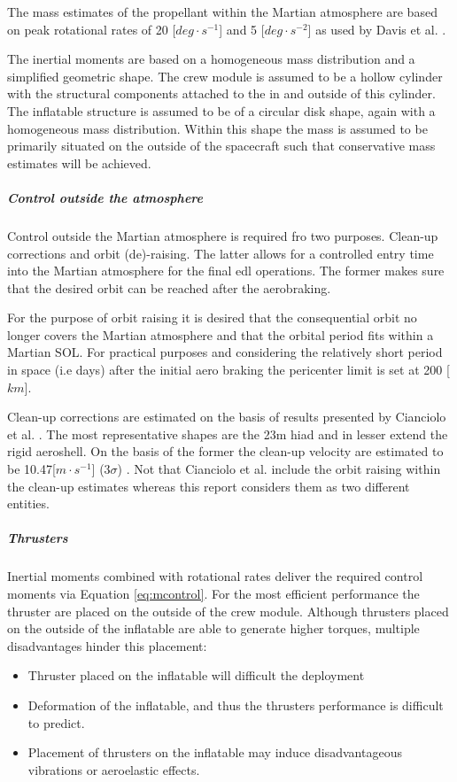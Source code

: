 The mass estimates of the propellant within the Martian atmosphere are based on peak rotational rates of 20 [$deg\cdot s^{-1}$] and 5 [$deg \cdot s^{-2}$] as used by Davis et al. \cite{Davis2010}.

The inertial moments are based on a homogeneous mass distribution and a simplified geometric shape. The crew module is assumed to be a hollow cylinder with the structural components attached to the in and outside of this cylinder. The inflatable structure is assumed to be of a circular disk shape, again with a homogeneous mass distribution. Within this shape the mass is assumed to be primarily situated on the outside of the spacecraft such that conservative mass estimates will be achieved.

\subparagraph{Control outside the atmosphere}
Control outside the Martian atmosphere is required fro two purposes. Clean-up corrections and orbit (de)-raising. The latter allows for a controlled entry time into the Martian atmosphere for the final \gls{edl} operations. The former makes sure that the desired orbit can be reached after the aerobraking.

For the purpose of orbit raising it is desired that the consequential orbit no longer covers the Martian atmosphere and that the orbital period fits within a Martian SOL. For practical purposes and considering the relatively short period in space (i.e days) after the initial aero braking the pericenter limit is set at 200 [$km$]. 

Clean-up corrections are estimated on the basis of results presented by Cianciolo et al. \cite{Cianciolo2010}. The most representative shapes are the 23m \gls{hiad} and in lesser extend the rigid aeroshell. On the basis of the former the clean-up velocity are estimated to be 10.47[$m\cdot s^{-1}$] ($3\sigma$) \cite[p.37]{Cianciolo2010}. Not that Cianciolo et al. include the orbit raising within the clean-up estimates whereas this report considers them as two different entities.


\subparagraph{Thrusters}
Inertial moments combined with rotational rates deliver the required control moments via Equation \ref{eq:mcontrol}. For the most efficient performance the thruster are placed on the outside of the crew module. Although thrusters placed on the outside of the inflatable are able to generate higher torques, multiple disadvantages hinder this placement:

\begin{itemize}
\item Thruster placed on the inflatable will difficult the deployment
\item Deformation of the inflatable, and thus the thrusters performance is difficult to predict.
\item Placement of thrusters on the inflatable may induce disadvantageous vibrations or aeroelastic effects.  
\end{itemize} 

